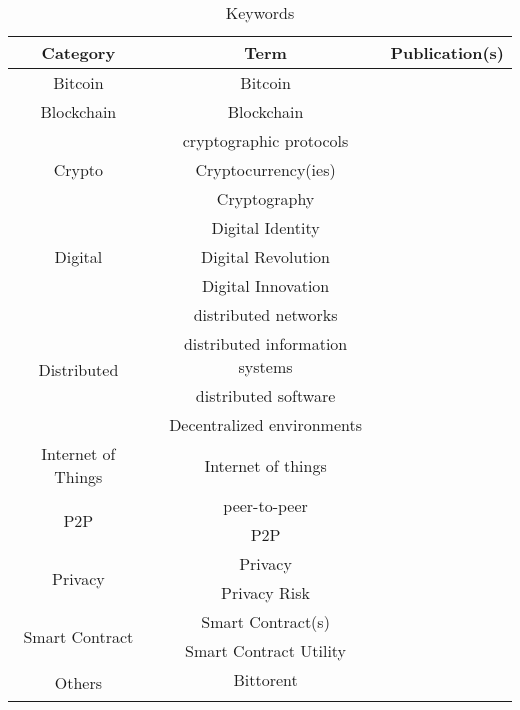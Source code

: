 \begin{longtable}{ |c|c|p{4cm}| }
	\caption{Keywords} \\
	\hline
 	\textbf{Category} & \textbf{Term} & \textbf{Publication(s)} \\ [0.5ex] 
 	\hline\hline
 	Bitcoin & Bitcoin & \cite{2016_Jacynycz,2017_Ouaddah,2015_Zyskind}\\ 
	 \hline
	 Blockchain & Blockchain & \cite{2018_Alessandra,2016_Bahga,2017_Coyne,2015_Dennis,2017_Gipp,2016_Jacynycz,2017_Madhwal,2017_Naerland,2017_Ouaddah,2016_Sharples,2016_Tian,2016_Yasin,2016_Yue,2015_Zyskind}\\ 
	 \hline
	 \multirow{3}{*}{Crypto} & cryptographic protocols & \cite{2016_Azaria,2015_Dennis} \\ \cline{2-3}
	 & Cryptocurrency(ies) & \cite{2016_Jacynycz,2017_Ouaddah}\\ \cline{2-3}
	 & Cryptography & \cite{2016_Kianmajd}\\
	 \hline
	  \multirow{3}{*}{Digital} & Digital Identity & \cite{2016_Yasin}\\ \cline{2-3}
	  & Digital Revolution & \multirow{2}{*}{\cite{2018_Alessandra}} \\ \cline{2-2}
	  & Digital Innovation & \\
	 \hline
	 \multirow{4}{*}{Distributed} & distributed networks & \cite{2015_Dennis}\\ \cline{2-3}
	  & distributed information systems
& \cite{2016_Azaria}\\ \cline{2-3}
	  & distributed software & \cite{2016_Jacynycz}\\ \cline{2-3}
	  & Decentralized environments & \cite{2017_Naerland} \\
	 \hline
 	Internet of Things & Internet of things & \cite{2016_Bahga,2017_Jaag,2016_Kianmajd}\\ 
	 \hline
	  \multirow{2}{*}{P2P} & peer-to-peer & \cite{2015_Dennis}\\ \cline{2-3} 
	  & P2P & \cite{2016_Jacynycz}\\
	 \hline
	 \multirow{2}{*}{Privacy} & Privacy & \cite{2017_Ouaddah,2015_Zyskind}\\  \cline{2-3}
	 & Privacy Risk & \cite{2016_Yue} \\
	 \hline
	 \multirow{2}{*}{Smart Contract} & Smart Contract(s) & \cite{2016_Bahga,2016_Jacynycz}\\ \cline{2-3}
	 & Smart Contract Utility & \cite{2016_Yasin} \\
	 \hline
	 \multirow{14}{*}{Others} & Bittorent  & \cite{2015_Dennis} \\ \cline{2-3}

\end{longtable}
